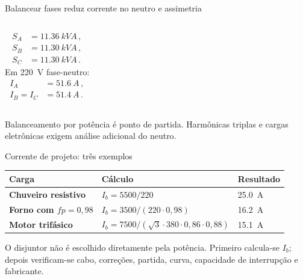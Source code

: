 \begin{frame}{Balancear fases reduz corrente no neutro e assimetria}
\small
\begin{columns}[T,onlytextwidth]
\begin{caixaEx}[title=Distribuição revisada]
\[
\begin{aligned}
S_A&=\SI{11.36}{kVA}\,,\\
S_B&=\SI{11.30}{kVA}\,,\\
S_C&=\SI{11.30}{kVA}\,.
\end{aligned}
\]
Em \SI{220}{V} fase-neutro:
\[
\begin{aligned}
I_A&=\SI{51.6}{A}\,,\\
I_B=I_C&=\SI{51.4}{A}\,.
\end{aligned}
\]
\end{caixaEx}
\end{columns}
\begin{caixaAt}
Balanceamento por potência é ponto de partida. Harmônicas triplas e cargas eletrônicas exigem análise adicional do neutro.
\end{caixaAt}
\end{frame}

\begin{frame}{Corrente de projeto: três exemplos}
\small
\begin{tabularx}{\textwidth}{>{\bfseries}p{2.5cm}X p{3.1cm}}
\toprule
Carga & Cálculo & Resultado \\
\midrule
Chuveiro resistivo & $I_b=5500/220$ & \SI{25.0}{A} \\
Forno com $fp=0{,}98$ & $I_b=3500/(220\cdot0{,}98)$ & \SI{16.2}{A} \\
Motor trifásico & $I_b=7500/(\sqrt3\cdot380\cdot0{,}86\cdot0{,}88)$ & \SI{15.1}{A} \\
\bottomrule
\end{tabularx}
\vspace{3mm}
\begin{caixaObs}
O disjuntor não é escolhido diretamente pela potência. Primeiro calcula-se $I_b$; depois verificam-se cabo, correções, partida, curva, capacidade de interrupção e fabricante.
\end{caixaObs}
\end{frame}

